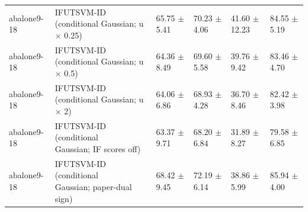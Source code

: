 \begin{table}[!t]
{\begin{tabular}{llllll}
abalone9-18 & \shortstack[l]{IFUTSVM-ID (conditional\\Gaussian; u \(\times\) 0.25)} & 65.75 \(\pm\) 5.41 & 70.23 \(\pm\) 4.06 & 41.60 \(\pm\) 12.23 & 84.55 \(\pm\) 5.19 \\
abalone9-18 & \shortstack[l]{IFUTSVM-ID (conditional\\Gaussian; u \(\times\) 0.5)} & 64.36 \(\pm\) 8.49 & 69.60 \(\pm\) 5.58 & 39.76 \(\pm\) 9.42 & 83.46 \(\pm\) 4.70 \\
abalone9-18 & \shortstack[l]{IFUTSVM-ID (conditional\\Gaussian; u \(\times\) 2)} & 64.06 \(\pm\) 6.86 & 68.93 \(\pm\) 4.28 & 36.70 \(\pm\) 8.46 & 82.42 \(\pm\) 3.98 \\
abalone9-18 & \shortstack[l]{IFUTSVM-ID (conditional\\Gaussian; IF scores off)} & 63.37 \(\pm\) 9.71 & 68.20 \(\pm\) 6.84 & 31.89 \(\pm\) 8.27 & 79.58 \(\pm\) 6.85 \\
abalone9-18 & \shortstack[l]{IFUTSVM-ID (conditional\\Gaussian; paper-dual\\sign)} & 68.42 \(\pm\) 9.45 & 72.19 \(\pm\) 6.14 & 38.86 \(\pm\) 5.99 & 85.94 \(\pm\) 4.00 \\
\hline
\end{tabular}%
}
\end{table}

